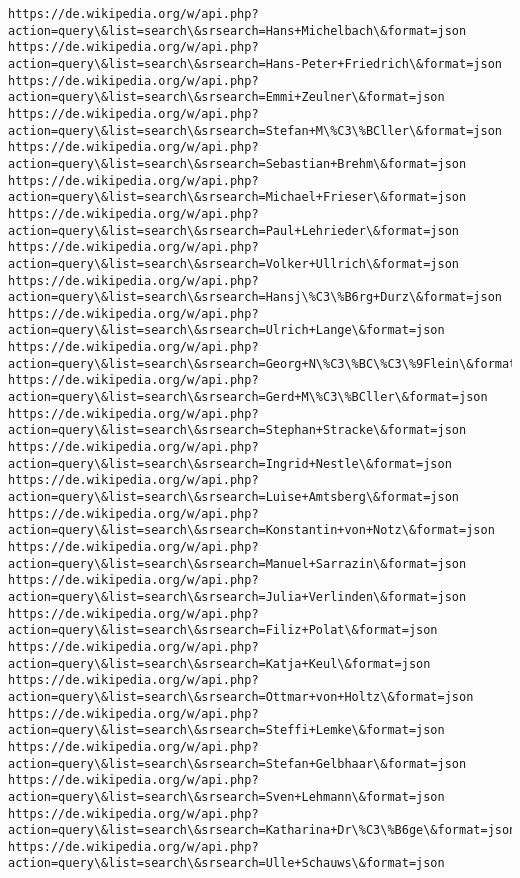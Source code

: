\documentclass[11pt]{article}
\begin{document}
\begin{Verbatim}[commandchars=\\\{\}]
https://de.wikipedia.org/w/api.php?action=query\&list=search\&srsearch=Hans+Michelbach\&format=json
https://de.wikipedia.org/w/api.php?action=query\&list=search\&srsearch=Hans-Peter+Friedrich\&format=json
https://de.wikipedia.org/w/api.php?action=query\&list=search\&srsearch=Emmi+Zeulner\&format=json
https://de.wikipedia.org/w/api.php?action=query\&list=search\&srsearch=Stefan+M\%C3\%BCller\&format=json
https://de.wikipedia.org/w/api.php?action=query\&list=search\&srsearch=Sebastian+Brehm\&format=json
https://de.wikipedia.org/w/api.php?action=query\&list=search\&srsearch=Michael+Frieser\&format=json
https://de.wikipedia.org/w/api.php?action=query\&list=search\&srsearch=Paul+Lehrieder\&format=json
https://de.wikipedia.org/w/api.php?action=query\&list=search\&srsearch=Volker+Ullrich\&format=json
https://de.wikipedia.org/w/api.php?action=query\&list=search\&srsearch=Hansj\%C3\%B6rg+Durz\&format=json
https://de.wikipedia.org/w/api.php?action=query\&list=search\&srsearch=Ulrich+Lange\&format=json
https://de.wikipedia.org/w/api.php?action=query\&list=search\&srsearch=Georg+N\%C3\%BC\%C3\%9Flein\&format=json
https://de.wikipedia.org/w/api.php?action=query\&list=search\&srsearch=Gerd+M\%C3\%BCller\&format=json
https://de.wikipedia.org/w/api.php?action=query\&list=search\&srsearch=Stephan+Stracke\&format=json
https://de.wikipedia.org/w/api.php?action=query\&list=search\&srsearch=Ingrid+Nestle\&format=json
https://de.wikipedia.org/w/api.php?action=query\&list=search\&srsearch=Luise+Amtsberg\&format=json
https://de.wikipedia.org/w/api.php?action=query\&list=search\&srsearch=Konstantin+von+Notz\&format=json
https://de.wikipedia.org/w/api.php?action=query\&list=search\&srsearch=Manuel+Sarrazin\&format=json
https://de.wikipedia.org/w/api.php?action=query\&list=search\&srsearch=Julia+Verlinden\&format=json
https://de.wikipedia.org/w/api.php?action=query\&list=search\&srsearch=Filiz+Polat\&format=json
https://de.wikipedia.org/w/api.php?action=query\&list=search\&srsearch=Katja+Keul\&format=json
https://de.wikipedia.org/w/api.php?action=query\&list=search\&srsearch=Ottmar+von+Holtz\&format=json
https://de.wikipedia.org/w/api.php?action=query\&list=search\&srsearch=Steffi+Lemke\&format=json
https://de.wikipedia.org/w/api.php?action=query\&list=search\&srsearch=Stefan+Gelbhaar\&format=json
https://de.wikipedia.org/w/api.php?action=query\&list=search\&srsearch=Sven+Lehmann\&format=json
https://de.wikipedia.org/w/api.php?action=query\&list=search\&srsearch=Katharina+Dr\%C3\%B6ge\&format=json
https://de.wikipedia.org/w/api.php?action=query\&list=search\&srsearch=Ulle+Schauws\&format=json

\end{Verbatim}
\end{document}
